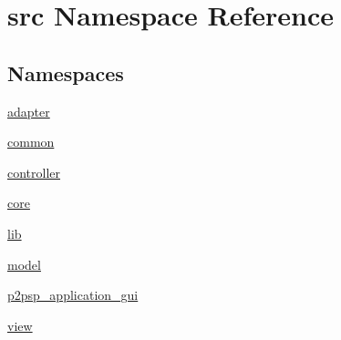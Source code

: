 \hypertarget{namespacesrc}{}\section{src Namespace Reference}
\label{namespacesrc}
\subsection*{Namespaces}
\begin{DoxyCompactItemize}
\item 
 \hyperlink{namespacesrc_1_1adapter}{adapter}
\item 
 \hyperlink{namespacesrc_1_1common}{common}
\item 
 \hyperlink{namespacesrc_1_1controller}{controller}
\item 
 \hyperlink{namespacesrc_1_1core}{core}
\item 
 \hyperlink{namespacesrc_1_1lib}{lib}
\item 
 \hyperlink{namespacesrc_1_1model}{model}
\item 
 \hyperlink{namespacesrc_1_1p2psp__application__gui}{p2psp\+\_\+application\+\_\+gui}
\item 
 \hyperlink{namespacesrc_1_1view}{view}
\end{DoxyCompactItemize}

